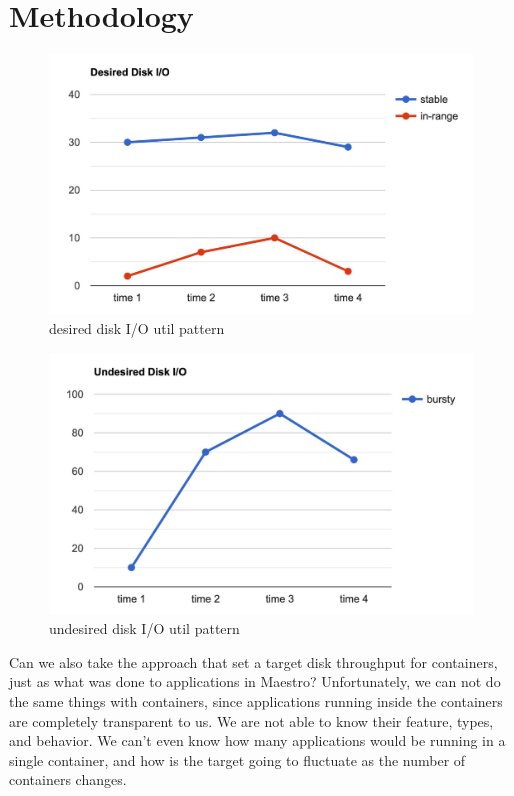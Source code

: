 \documentclass[10pt, conference,compsoc]{IEEEtran}
\begin{document}
\section{Methodology}
\begin{figure}
  \centering
    \includegraphics[width=\linewidth]{resources/desired.pdf}
    \caption{desired disk I/O util pattern}
    \label{fig:desired}
  \end{figure}

  \begin{figure}
    \centering
      \includegraphics[width=\linewidth]{resources/undesired.pdf}
      \caption{undesired disk I/O util pattern}
      \label{fig:undesired}
    \end{figure}
Can we also take the approach that set a target disk throughput for containers, just as what was done to applications in Maestro? Unfortunately, we can not do the same things with containers, since applications running inside the containers are completely transparent to us. We are not able to know their feature, types, and behavior. We can't even know how many applications would be running in a single container, and how is the target going to fluctuate as the number of containers changes.\\
\end{document}
